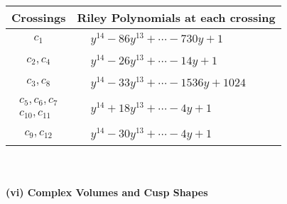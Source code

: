 \documentclass[1p]{elsarticle_modified}
\theoremstyle{definition}
\begin{document}
\begin{tabular}{m{50pt}|m{274pt}}
Crossings & \hspace{64pt}Riley Polynomials at each crossing \\
\hline $$\begin{aligned}c_{1}\end{aligned}$$&$\begin{aligned}
&y^{14}-86 y^{13}+\cdots-730 y+1
\end{aligned}$\\
\hline $$\begin{aligned}c_{2},c_{4}\end{aligned}$$&$\begin{aligned}
&y^{14}-26 y^{13}+\cdots-14 y+1
\end{aligned}$\\
\hline $$\begin{aligned}c_{3},c_{8}\end{aligned}$$&$\begin{aligned}
&y^{14}-33 y^{13}+\cdots-1536 y+1024
\end{aligned}$\\
\hline $$\begin{aligned}c_{5},c_{6},c_{7}\\c_{10},c_{11}\end{aligned}$$&$\begin{aligned}
&y^{14}+18 y^{13}+\cdots-4 y+1
\end{aligned}$\\
\hline $$\begin{aligned}c_{9},c_{12}\end{aligned}$$&$\begin{aligned}
&y^{14}-30 y^{13}+\cdots-4 y+1
\end{aligned}$\\
\hline
\end{tabular}\\~\\
\newpage\flushleft \textbf{(vi) Complex Volumes and Cusp Shapes}
\end{document}
